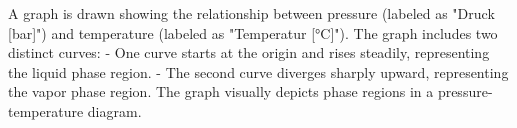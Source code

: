 A graph is drawn showing the relationship between pressure (labeled as "Druck [bar]") and temperature (labeled as "Temperatur [°C]"). The graph includes two distinct curves:  
- One curve starts at the origin and rises steadily, representing the liquid phase region.  
- The second curve diverges sharply upward, representing the vapor phase region.  
The graph visually depicts phase regions in a pressure-temperature diagram.
